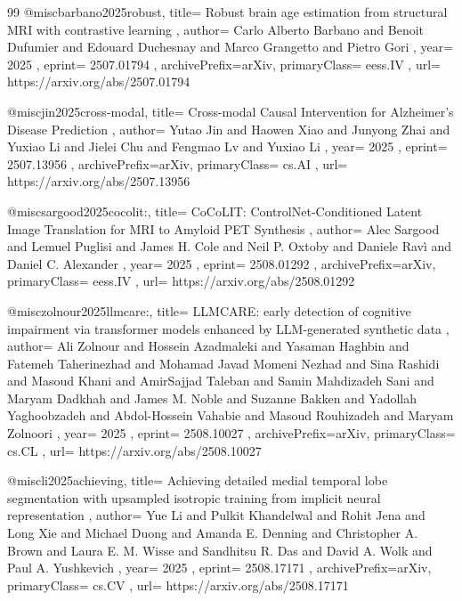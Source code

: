 \documentclass[11pt,a4paper]{article}
\begin{document}
\begin{thebibliography}{99}
@misc{barbano2025robust,
  title={ Robust brain age estimation from structural MRI with contrastive learning },
  author={ Carlo Alberto Barbano and Benoit Dufumier and Edouard Duchesnay and Marco Grangetto and Pietro Gori },
  year={ 2025 },
  eprint={ 2507.01794 },
  archivePrefix={arXiv},
  primaryClass={ eess.IV },
  url={ https://arxiv.org/abs/2507.01794 }
}


@misc{jin2025cross-modal,
  title={ Cross-modal Causal Intervention for Alzheimer's Disease Prediction },
  author={ Yutao Jin and Haowen Xiao and Junyong Zhai and Yuxiao Li and Jielei Chu and Fengmao Lv and Yuxiao Li },
  year={ 2025 },
  eprint={ 2507.13956 },
  archivePrefix={arXiv},
  primaryClass={ cs.AI },
  url={ https://arxiv.org/abs/2507.13956 }
}


@misc{sargood2025cocolit:,
  title={ CoCoLIT: ControlNet-Conditioned Latent Image Translation for MRI to Amyloid PET Synthesis },
  author={ Alec Sargood and Lemuel Puglisi and James H. Cole and Neil P. Oxtoby and Daniele Ravì and Daniel C. Alexander },
  year={ 2025 },
  eprint={ 2508.01292 },
  archivePrefix={arXiv},
  primaryClass={ eess.IV },
  url={ https://arxiv.org/abs/2508.01292 }
}


@misc{zolnour2025llmcare:,
  title={ LLMCARE: early detection of cognitive impairment via transformer models enhanced by LLM-generated synthetic data },
  author={ Ali Zolnour and Hossein Azadmaleki and Yasaman Haghbin and Fatemeh Taherinezhad and Mohamad Javad Momeni Nezhad and Sina Rashidi and Masoud Khani and AmirSajjad Taleban and Samin Mahdizadeh Sani and Maryam Dadkhah and James M. Noble and Suzanne Bakken and Yadollah Yaghoobzadeh and Abdol-Hossein Vahabie and Masoud Rouhizadeh and Maryam Zolnoori },
  year={ 2025 },
  eprint={ 2508.10027 },
  archivePrefix={arXiv},
  primaryClass={ cs.CL },
  url={ https://arxiv.org/abs/2508.10027 }
}


@misc{li2025achieving,
  title={ Achieving detailed medial temporal lobe segmentation with upsampled isotropic training from implicit neural representation },
  author={ Yue Li and Pulkit Khandelwal and Rohit Jena and Long Xie and Michael Duong and Amanda E. Denning and Christopher A. Brown and Laura E. M. Wisse and Sandhitsu R. Das and David A. Wolk and Paul A. Yushkevich },
  year={ 2025 },
  eprint={ 2508.17171 },
  archivePrefix={arXiv},
  primaryClass={ cs.CV },
  url={ https://arxiv.org/abs/2508.17171 }
}



\end{thebibliography}
\end{document}
